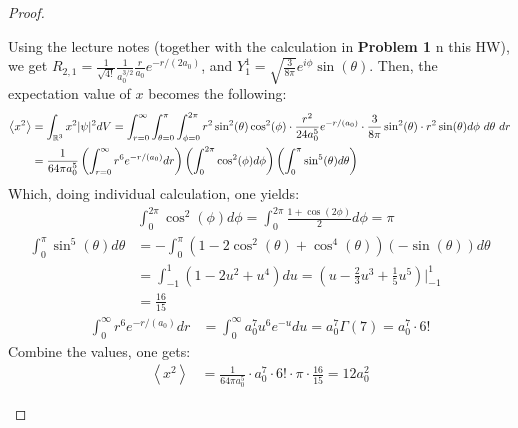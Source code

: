 \documentclass{article}
\begin{document}
\begin{proof}
\begin{itemize}
    Using the lecture notes (together with the calculation in \textbf{Problem 1} n this HW), we get $R_{2,1} = \frac{1}{\sqrt{4!}}\frac{1}{a_0^{3/2}}\frac{r}{a_0}e^{-r/(2a_0)}$, and $Y_1^1 = \sqrt{\frac{3}{8\pi}}e^{i\phi}\sin(\theta)$. Then, the expectation value of $x$ becomes the following:
    \begin{align}
        \left<x^2\right> &= \int_{\mathbb{R}^3}x^2|\psi|^2dV = \int_{r=0}^{\infty}\int_{\theta=0}^{\pi}\int_{\phi=0}^{2\pi}r^2\sin^2(\theta)\cos^2(\phi)\cdot \frac{r^2}{24a_0^5}e^{-r/(a_0)}\cdot \frac{3}{8\pi}\sin^2(\theta)\cdot r^2\sin(\theta)d\phi\ d\theta\ dr\\
        &= \frac{1}{64\pi a_0^5}\left(\int_{r=0}^{\infty}r^6e^{-r/(a_0)}dr\right)\left(\int_{0}^{2\pi}\cos^2(\phi)d\phi\right)\left(\int_{0}^{\pi}\sin^5(\theta)d\theta\right)
    \end{align}
    Which, doing individual calculation, one yields:
    \begin{align}
        &\int_{0}^{2\pi}\cos^2(\phi)d\phi = \int_{0}^{2\pi}\frac{1+\cos(2\phi)}{2}d\phi = \pi
    \end{align}
    \begin{align}
        \int_{0}^{\pi}\sin^5(\theta)d\theta &= -\int_{0}^{\pi}(1-2\cos^2(\theta)+\cos^4(\theta))(-\sin(\theta))d\theta\\
        &= \int_{-1}^{1}(1-2u^2+u^4)du = \left(u-\frac{2}{3}u^3+\frac{1}{5}u^5\right)\bigg|_{-1}^{1}\\
        &= \frac{16}{15}
    \end{align}
    \begin{align}
        \int_{0}^{\infty}r^6e^{-r/(a_0)}dr &= \int_{0}^{\infty}a_0^7u^6e^{-u}du = a_0^7 \Gamma(7) = a_0^7\cdot 6!
    \end{align}
    Combine the values, one gets:
    \begin{align}
        \left<x^2\right> &= \frac{1}{64\pi a_0^5}\cdot a_0^7\cdot 6! \cdot \pi \cdot \frac{16}{15} = 12a_0^2
    \end{align}

    \hfil


\end{itemize}
\end{proof}
\end{document}
